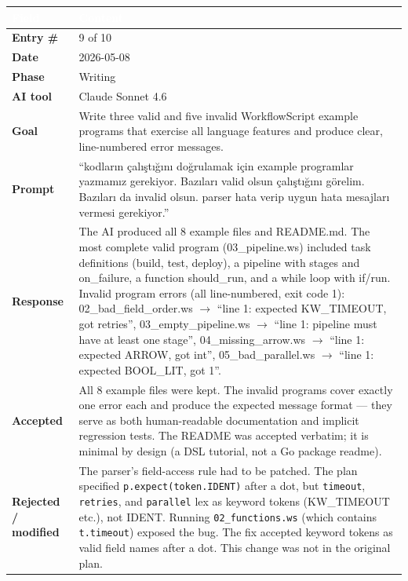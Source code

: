\documentclass[a4paper,10pt]{article}
\begin{document}
\begin{tabular}{|
    >{\bfseries}m{3.5cm}|
    m{10cm}|
}
\hline
\rowcolor{headerblue}
\textcolor{white}{Field} & \textcolor{white}{\textbf{Content}} \\
\hline
\rowcolor{white}
Entry \#        & 9 of 10 \\
\hline
\rowcolor{altrow}
Date            & 2026-05-08 \\
\hline
\rowcolor{white}
Phase           & Writing \\
\hline
\rowcolor{altrow}
AI tool         & Claude Sonnet 4.6  \\
\hline
\rowcolor{white}
Goal            & Write three valid and five invalid WorkflowScript example programs that exercise all language features and produce clear, line-numbered error messages. \\
\hline
\rowcolor{altrow}
Prompt          & ``kodların çalıştığını doğrulamak için example programlar yazmamız gerekiyor. Bazıları valid olsun çalıştığını görelim. Bazıları da invalid olsun. parser hata verip uygun hata mesajları vermesi gerekiyor.'' \\
\hline
\rowcolor{white}
Response & The AI produced all 8 example files and README.md. The most complete valid program (03\_pipeline.ws) included task definitions (build, test, deploy), a pipeline with stages and on\_failure, a function should\_run, and a while loop with if/run. Invalid program errors (all line-numbered, exit code 1): 02\_bad\_field\_order.ws $\rightarrow$ ``line 1: expected KW\_TIMEOUT, got retries'', 03\_empty\_pipeline.ws $\rightarrow$ ``line 1: pipeline must have at least one stage'', 04\_missing\_arrow.ws $\rightarrow$ ``line 1: expected ARROW, got int'', 05\_bad\_parallel.ws $\rightarrow$ ``line 1: expected BOOL\_LIT, got 1''. \\
\hline
\rowcolor{altrow}
Accepted        & All 8 example files were kept. The invalid programs cover exactly one error each and produce the expected message format --- they serve as both human-readable documentation and implicit regression tests. The README was accepted verbatim; it is minimal by design (a DSL tutorial, not a Go package readme). \\
\hline
\rowcolor{white}
Rejected / modified & The parser's field-access rule had to be patched. The plan specified \texttt{p.expect(token.IDENT)} after a dot, but \texttt{timeout}, \texttt{retries}, and \texttt{parallel} lex as keyword tokens (KW\_TIMEOUT etc.), not IDENT. Running \texttt{02\_functions.ws} (which contains \texttt{t.timeout}) exposed the bug. The fix accepted keyword tokens as valid field names after a dot. This change was not in the original plan. \\

\end{tabular}
\end{document}
